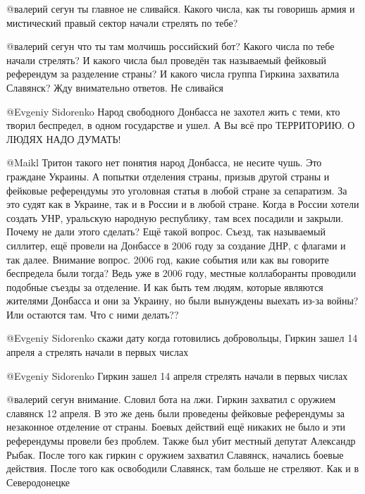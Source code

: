 \begin{multicols}{2}
\begin{itemize}

@валерий сегун  ты главное не сливайся. Какого числа, как ты говоришь армия и
мистический правый сектор начали стрелять по тебе? 


@валерий сегун  что ты там молчишь российский бот? Какого числа по тебе начали
стрелять? И какого числа был проведён так называемый фейковый референдум за
разделение страны? И какого числа группа Гиркина захватила Славянск? Жду
внимательно ответов. Не сливайся


@Evgeniy Sidorenko  Народ свободного Донбасса не захотел жить с теми, кто
творил беспредел, в одном государстве и ушел. А Вы всё про ТЕРРИТОРИЮ. О ЛЮДЯХ
НАДО ДУМАТЬ!


@Maikl Тритон  такого нет понятия народ Донбасса, не несите чушь. Это граждане
Украины. А попытки отделения страны, призыв другой страны и фейковые
референдумы это уголовная статья в любой стране за сепаратизм. За это судят
как в Украине, так и в России и в любой стране. Когда в России хотели создать
УНР, уральскую народную республику, там всех посадили и закрыли. Почему не
дали этого сделать? Ещё такой вопрос. Съезд, так называемый силлитер, ещё
провели на Донбассе в 2006 году за создание ДНР, с флагами и так далее.
Внимание вопрос. 2006 год, какие события или как вы говорите беспредела были
тогда? Ведь уже в 2006 году, местные коллаборанты проводили подобные съезды за
отделение. И как быть тем людям, которые являются жителями Донбасса и они за
Украину, но были вынуждены выехать из-за войны? Или остаются там. Что с ними
делать?? 


@Evgeniy Sidorenko скажи дату когда готовились добровольцы, Гиркин зашел 14
апреля а стрелять начали в первых числах

 @Evgeniy Sidorenko  Гиркин зашел 14 апреля стрелять начали в первых числах

@валерий сегун  внимание. Словил бота на лжи. Гиркин захватил с оружием
славянск 12 апреля. В это же день были проведены фейковые  референдумы за
незаконное отделение от страны. Боевых действий ещё никаких не было и эти
референдумы провели без проблем. Также был убит местный депутат Александр
Рыбак. После того как гиркин с оружием захватил Славянск, начались боевые
действия. После того как освободили Славянск, там больше не стреляют. Как и в
Северодонецке


\end{itemize}
\end{multicols}
